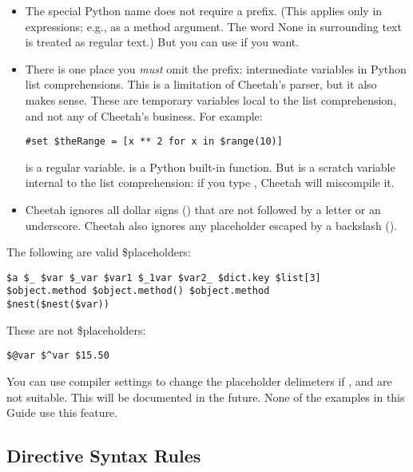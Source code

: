 \begin{itemize}
\item The special Python name  does not require a
     \code{\$} prefix.  (This applies only in expressions; e.g., as a method
     argument.  The word None in surrounding text is treated as regular text.)
     But you can use  if you want.

\item There is one place you {\em must} omit the \code{\$} prefix: intermediate
     variables in Python list comprehensions.  This is a limitation of
     Cheetah's parser, but it also makes sense.  These are temporary variables
     local to the list comprehension,  and not any of Cheetah's business.  For
     example:
\begin{verbatim}
#set $theRange = [x ** 2 for x in $range(10)]
\end{verbatim}
      is a regular  variable.   is a
     Python built-in function.  But  is a scratch variable internal to
     the list comprehension: if you type , Cheetah will miscompile it.
\item Cheetah ignores all dollar signs (\code{\$}) that are not followed by a
     letter or an underscore.  Cheetah also ignores any placeholder escaped by a
     backslash ().

\end{itemize} 

The following are valid \$placeholders:
\begin{verbatim}
$a $_ $var $_var $var1 $_1var $var2_ $dict.key $list[3]
$object.method $object.method() $object.method
$nest($nest($var))
\end{verbatim}

These are not \$placeholders:
\begin{verbatim}
$@var $^var $15.50
\end{verbatim}

You can use compiler settings to change the placeholder delimeters if
\code{\$}, \code{\{} and \code{\}} are not suitable.  This will be documented
in the future.  None of the examples in this Guide use this feature.

\subsection{Directive Syntax Rules}
\label{language.directives}

